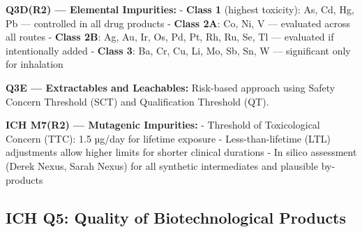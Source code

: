 \documentclass[
  11pt,
  a4paper,
]{report}
\begin{document}
\textbf{Q3D(R2) --- Elemental Impurities:} - \textbf{Class 1} (highest
toxicity): As, Cd, Hg, Pb --- controlled in all drug products -
\textbf{Class 2A}: Co, Ni, V --- evaluated across all routes -
\textbf{Class 2B}: Ag, Au, Ir, Os, Pd, Pt, Rh, Ru, Se, Tl --- evaluated
if intentionally added - \textbf{Class 3}: Ba, Cr, Cu, Li, Mo, Sb, Sn, W
--- significant only for inhalation

\textbf{Q3E --- Extractables and Leachables:} Risk-based approach using
Safety Concern Threshold (SCT) and Qualification Threshold (QT).

\textbf{ICH M7(R2) --- Mutagenic Impurities:} - Threshold of
Toxicological Concern (TTC): 1.5 µg/day for lifetime exposure -
Less-than-lifetime (LTL) adjustments allow higher limits for shorter
clinical durations - In silico assessment (Derek Nexus, Sarah Nexus) for
all synthetic intermediates and plausible by-products

\hypertarget{ich-q5-quality-of-biotechnological-products}{%
\subsection{ICH Q5: Quality of Biotechnological
Products}\label{ich-q5-quality-of-biotechnological-products}}
\end{document}

